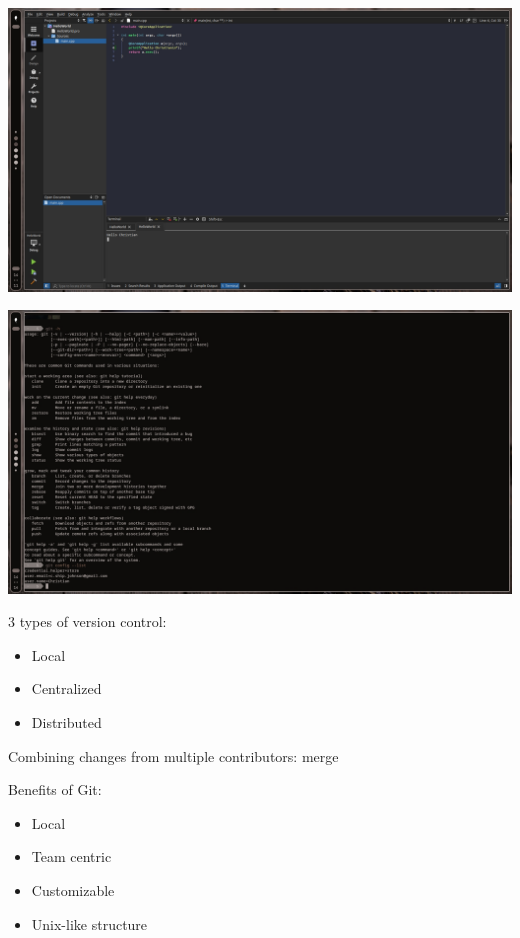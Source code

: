 \documentclass[11pt]{article}
\author{Christian Johnson}
\date{\today}
\title{}
\begin{document}
\begin{center}
\includegraphics[width=.9\linewidth]{HelloWorldScreenshot.png}
\end{center}

\begin{center}
\includegraphics[width=.9\linewidth]{GitScreenshot.png}
\end{center}

3 types of version control:
\begin{itemize}
\item Local
\item Centralized
\item Distributed
\end{itemize}

Combining changes from multiple contributors:
merge

Benefits of Git:
\begin{itemize}
\item Local
\item Team centric
\item Customizable
\item Unix-like structure
\end{itemize}
\end{document}
